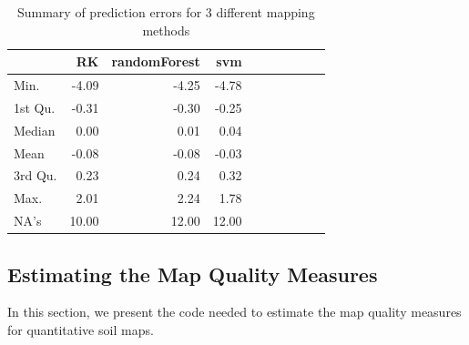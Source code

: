 \documentclass[10pt,b5paper,]{book}
\theoremstyle{definition}
\theoremstyle{definition}
\theoremstyle{definition}
\theoremstyle{remark}
\begin{document}
\begin{table}

\caption{\label{tab:prederrors}Summary of prediction errors for 3 different mapping methods}
\centering
\begin{tabular}[t]{lrrrrrrrrr}
\toprule
  & RK & randomForest & svm\\
\midrule
Min. & -4.09 & -4.25 & -4.78\\
1st Qu. & -0.31 & -0.30 & -0.25\\
Median & 0.00 & 0.01 & 0.04\\
Mean & -0.08 & -0.08 & -0.03\\
3rd Qu. & 0.23 & 0.24 & 0.32\\
\addlinespace
Max. & 2.01 & 2.24 & 1.78\\
NA's & 10.00 & 12.00 & 12.00\\
\bottomrule
\end{tabular}
\end{table}

\hypertarget{estimating-the-map-quality-measures}{%
\subsection{Estimating the Map Quality
Measures}\label{estimating-the-map-quality-measures}}

In this section, we present the code needed to estimate the map quality
measures for quantitative soil maps.
\end{document}
